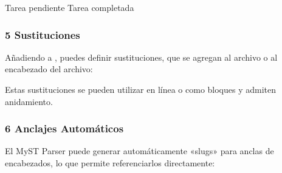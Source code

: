 \documentclass[a4paper,10pt,oneside,spanish,openany]{sphinxmanual}
\begin{document}
\begin{sphinxVerbatim}[commandchars=\\\{\}]
 Tarea pendiente
 Tarea completada
\end{sphinxVerbatim}


\subsubsection{5 Sustituciones}
\label{\detokenize{configuracion_inicial/013.guia_de_myst_parser:sustituciones}}
\sphinxAtStartPar
Añadiendo  a , puedes definir sustituciones, que se agregan al archivo  o al encabezado del archivo:

\begin{sphinxVerbatim}[commandchars=\\\{\}]
\end{sphinxVerbatim}

\sphinxAtStartPar
Estas sustituciones se pueden utilizar en línea o como bloques y admiten anidamiento.


\subsubsection{6 Anclajes Automáticos}
\label{\detokenize{configuracion_inicial/013.guia_de_myst_parser:anclajes-automaticos}}
\sphinxAtStartPar
El MyST Parser puede generar automáticamente «slugs» para anclas de encabezados, lo que permite referenciarlos directamente:

\begin{sphinxVerbatim}[commandchars=\\\{\}]
  
\end{sphinxVerbatim}
\end{document}
